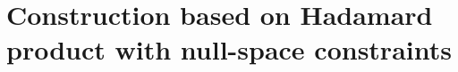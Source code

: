 \documentclass[journal,draftcls,onecolumn]{IEEEtran}
\theoremstyle{mystyle}
\newtheorem{defn}{Definition}
\begin{document}






\section{Construction based on Hadamard product with null-space constraints}
\label{sec:construction_RHPNSC}
\end{document}
